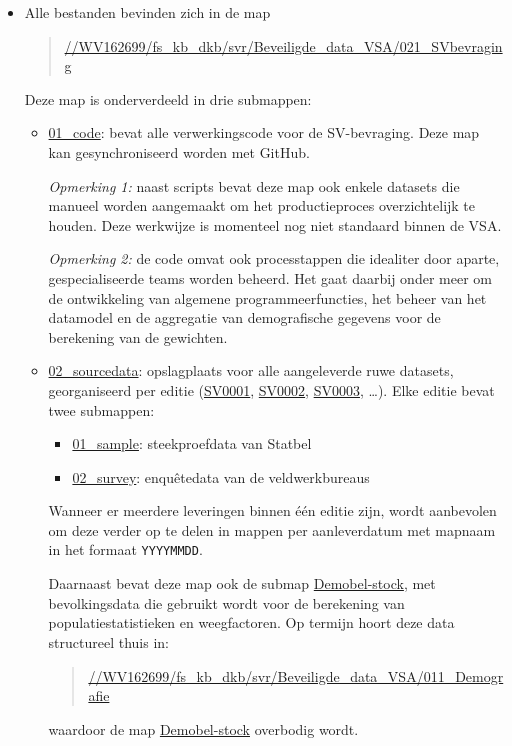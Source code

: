 \documentclass{VSAnote}
\begin{document}
\begin{itemize}

\item Alle bestanden bevinden zich in de map
\begin{quote}
\url{//WV162699/fs_kb_dkb/svr/Beveiligde_data_VSA/021_SVbevraging}
\end{quote}
Deze map is onderverdeeld in drie submappen:

\begin{itemize}

\item \url{01_code}: bevat alle verwerkingscode voor de SV-bevraging. Deze map kan gesynchroniseerd worden met GitHub.

\textit{Opmerking 1:} naast scripts bevat deze map ook enkele datasets die manueel worden aangemaakt om het productieproces overzichtelijk te houden. Deze werkwijze is momenteel nog niet standaard binnen de VSA.

\textit{Opmerking 2:} de code omvat ook processtappen die idealiter door aparte, gespecialiseerde teams worden beheerd. Het gaat daarbij onder meer om de ontwikkeling van algemene programmeerfuncties, het beheer van het datamodel en de aggregatie van demografische gegevens voor de berekening van de gewichten.

\item \url{02_sourcedata}: opslagplaats voor alle aangeleverde ruwe datasets, georganiseerd per editie (\url{SV0001}, \url{SV0002}, \url{SV0003}, \ldots). Elke editie bevat twee submappen:
\begin{itemize}[nosep]
\item \url{01_sample}: steekproefdata van Statbel
\item \url{02_survey}: enquêtedata van de veldwerkbureaus
\end{itemize}

Wanneer er meerdere leveringen binnen één editie zijn, wordt aanbevolen om deze verder op te delen in mappen per aanleverdatum met mapnaam in het formaat \texttt{YYYYMMDD}.

Daarnaast bevat deze map ook de submap \url{Demobel-stock}, met bevolkingsdata die gebruikt wordt voor de berekening van populatiestatistieken en weegfactoren. Op termijn hoort deze data structureel thuis in:
\begin{quote}
\url{//WV162699/fs_kb_dkb/svr/Beveiligde_data_VSA/011_Demografie}
\end{quote}
waardoor de map \url{Demobel-stock} overbodig wordt.


\end{itemize}
\end{itemize}
\end{document}
